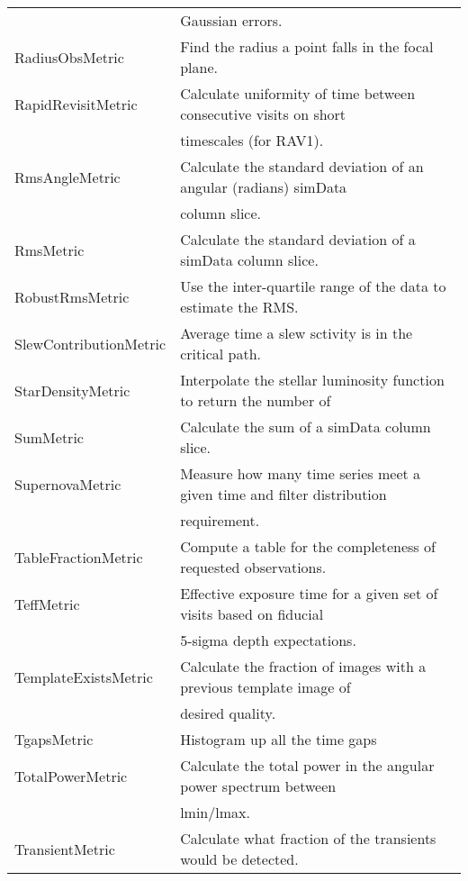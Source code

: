 \begin{table}
\begin{tabular}{ll}
  &  Gaussian errors. \\
 RadiusObsMetric &  Find the radius a point falls in the focal plane. \\
 RapidRevisitMetric &  Calculate uniformity of time between consecutive visits on short \\
  &  timescales (for RAV1). \\
 RmsAngleMetric &  Calculate the standard deviation of an angular (radians) simData \\
  &  column slice. \\
 RmsMetric &  Calculate the standard deviation of a simData column slice. \\
 RobustRmsMetric &  Use the inter-quartile range of the data to estimate the RMS. \\
 SlewContributionMetric &  Average time a slew sctivity is in the critical path. \\
 StarDensityMetric &  Interpolate the stellar luminosity function to return the number of \\
 SumMetric &  Calculate the sum of a simData column slice. \\
 SupernovaMetric &  Measure how many time series meet a given time and filter distribution \\
  &  requirement. \\
 TableFractionMetric &  Compute a table for the completeness of requested observations. \\
 TeffMetric &  Effective exposure time for a given set of visits based on fiducial \\
  &  5-sigma depth expectations. \\
 TemplateExistsMetric &  Calculate the fraction of images with a previous template image of \\
  &  desired quality. \\
 TgapsMetric &  Histogram up all the time gaps \\
 TotalPowerMetric &  Calculate the total power in the angular power spectrum between \\
  &  lmin/lmax. \\
 TransientMetric &  Calculate what fraction of the transients would be detected. \\
\hline
\end{tabular}

\end{table}
